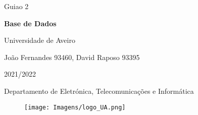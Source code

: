 \documentclass{report}
\begin{document}
\justifying

\def\titulo{Guiao 2}
\def\autores{João Fernandes 93460, David Raposo 93395}
\def\letivo{2021/2022}
\def\cadeira{Base de Dados}
\def\departamento{Departamento de Eletrónica, Telecomunicações e Informática}
\def\empresa{Universidade de Aveiro}


\begin{titlepage}

\begin{center}

\vspace*{30mm}

{\Huge \titulo}\\ 

\vspace{7mm}

{\LARGE \textbf{\cadeira}}\\

\vspace{5mm}

{\Large \empresa}\\

\vspace{10mm}

{\LARGE \autores}\\ 


\vspace{10mm}

{\LARGE \letivo}\\ 

\vspace{20mm}

{\large \departamento}\\ 

\vspace{5mm}

\begin{figure}[htp]
\centering
\texttt{[image: Imagens/logo\_UA.png]}
\label{fig:ua}
\end{figure}

\vspace{30mm}
\end{center}

\end{titlepage}


\tableofcontents

\chapter{}
\end{document}
